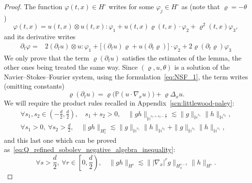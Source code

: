 \documentclass[AHL,Unicode,longabstracts,published]{cedram}
\newcommand{\bbH}{\mathbb{H}}
\newcommand{\bbP}{\mathbb{P}}
\newcommand{\Ssm}{H^{\circ}}
\let\oldforall\forall
\renewcommand*{\forall}{\mathrel{\oldforall}}
\begin{document}
\begin{proof}
The function $\varphi(t, x) \in \Ssm$ writes for some $\varphi_j \in \Ssm$ as (note that $\varrho = - \theta$)
\[
\varphi(t, x) = u(t, x) \otimes u(t, x) : \varphi_1 + u(t, x) \varrho(t, x) \cdot \varphi_2 + \varrho^2(t, x) \varphi_3,
\]
and its derivative writes
\begin{align*}
\partial_t \varphi = & 2 \left(\partial_t u\right) \otimes u : \varphi_1 + \big[\left(\partial_t u\right) \varrho + u \left(\partial_t \varrho \right)\big] \cdot \varphi_2 + 2 \varrho \left(\partial_t \varrho\right) \varphi_3
\end{align*}
We only prove that the term $\varrho (\partial_t u)$ satisfies the estimates of the lemma, the other ones being treated the same way. Since $(\varrho, u, \theta)$ is a solution of the Navier--Stokes--Fourier system, using the formulation~\eqref{eq:NSF_1}, the term writes (omitting constants)
\[
\varrho \left(\partial_t u\right) = \varrho \Big(\bbP \left(u \cdot \nabla_x u\right) \Big) + \varrho \Delta_x u.
\]
We will require the product rules recalled in Appendix~\ref{scn:littlewood-paley}:
\begin{gather}
\forall s_1, s_2 \in \left(-\frac{d}{2}, \frac{d}{2}\right), \quad s_1 + s_2 > 0, \quad \| g h \|_{ \dot{\bbH}^{s_1 + s_2 - \frac{d}{2}} } \lesssim \| g \|_{\dot{\bbH}^{s_1} } \| h \|_{\dot{\bbH}^{s_2} },
\label{eq:homogeneous_product}\\
\forall s_1 > 0,~\forall s_2 > \frac{d}{2}, \quad \| g h \|_{ H^s_1 } \lesssim \| g \|_{\dot{\bbH}^{s_1} } \| h \|_{\dot{\bbH}^{s_2} } + \| g \|_{\dot{\bbH}^{s_2} } \| h \|_{\dot{\bbH}^{s_1} },\label{eq:inhomogeneous_product}
\end{gather}
and this last one which can be proved as~\eqref{eq:Q_refined_sobolev_negative_algebra_inequality}:
\begin{equation}\label{eq:inhomogeneous_product_2}
\forall s > \frac{d}{2},~\forall r \in \left[0, \frac{d}{2}\right), \quad \| g h \|_{ H^s } \lesssim \| | \nabla_x |^r g \|_{ H^{s-r}_x } \| h \|_{H^{s} }.
\end{equation}


\end{proof}
\end{document}

